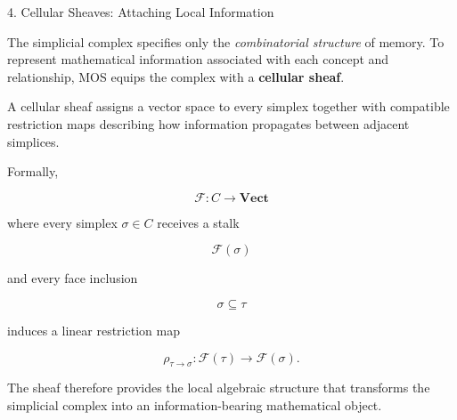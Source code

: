 %
%

\begin{mosbox}{4. Cellular Sheaves: Attaching Local Information}

\BodyFont

The simplicial complex specifies only the \emph{combinatorial structure}
of memory. To represent mathematical information associated with each
concept and relationship, MOS equips the complex with a
\textbf{cellular sheaf}.

A cellular sheaf assigns a vector space to every simplex together with
compatible restriction maps describing how information propagates between
adjacent simplices.

Formally,

\[
\boxed{
\mathcal{F} :
C
\longrightarrow
\mathbf{Vect}
}
\]

where every simplex $\sigma\in C$ receives a stalk

\[
\mathcal F(\sigma)
\]

and every face inclusion

\[
\sigma\subseteq\tau
\]

induces a linear restriction map

\[
\rho_{\tau\rightarrow\sigma}:
\mathcal F(\tau)
\longrightarrow
\mathcal F(\sigma).
\]

The sheaf therefore provides the local algebraic structure that transforms
the simplicial complex into an information-bearing mathematical object.

\end{mosbox}


\vspace{5mm}

